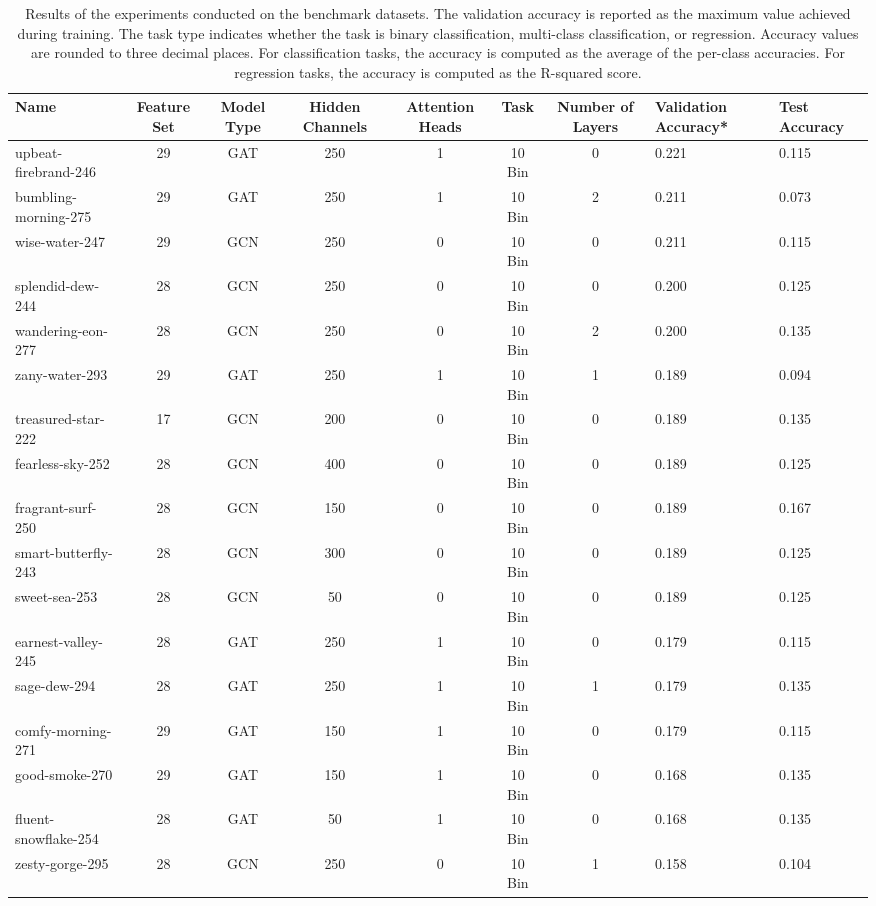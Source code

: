 \begin{table}
\caption{Results of the experiments conducted on the benchmark datasets. The validation accuracy is reported as the maximum value achieved during training. The task type indicates whether the task is binary classification, multi-class classification, or regression. Accuracy values are rounded to three decimal places. For classification tasks, the accuracy is computed as the average of the per-class accuracies. For regression tasks, the accuracy is computed as the R-squared score.}
\label{tab:wandb_export}
\begin{tabular}{lcccccc}
\toprule
Name & Feature Set & Model Type & Hidden Channels & Attention Heads & Task & Number of Layers & Validation Accuracy* & Test Accuracy \\
\midrule
upbeat-firebrand-246 & 29 & GAT & 250 & 1 & 10 Bin & 0 & 0.221 & 0.115 \\
bumbling-morning-275 & 29 & GAT & 250 & 1 & 10 Bin & 2 & 0.211 & 0.073 \\
wise-water-247 & 29 & GCN & 250 & 0 & 10 Bin & 0 & 0.211 & 0.115 \\
splendid-dew-244 & 28 & GCN & 250 & 0 & 10 Bin & 0 & 0.200 & 0.125 \\
wandering-eon-277 & 28 & GCN & 250 & 0 & 10 Bin & 2 & 0.200 & 0.135 \\
zany-water-293 & 29 & GAT & 250 & 1 & 10 Bin & 1 & 0.189 & 0.094 \\
treasured-star-222 & 17 & GCN & 200 & 0 & 10 Bin & 0 & 0.189 & 0.135 \\
fearless-sky-252 & 28 & GCN & 400 & 0 & 10 Bin & 0 & 0.189 & 0.125 \\
fragrant-surf-250 & 28 & GCN & 150 & 0 & 10 Bin & 0 & 0.189 & 0.167 \\
smart-butterfly-243 & 28 & GCN & 300 & 0 & 10 Bin & 0 & 0.189 & 0.125 \\
sweet-sea-253 & 28 & GCN & 50 & 0 & 10 Bin & 0 & 0.189 & 0.125 \\
earnest-valley-245 & 28 & GAT & 250 & 1 & 10 Bin & 0 & 0.179 & 0.115 \\
sage-dew-294 & 28 & GAT & 250 & 1 & 10 Bin & 1 & 0.179 & 0.135 \\
comfy-morning-271 & 29 & GAT & 150 & 1 & 10 Bin & 0 & 0.179 & 0.115 \\
good-smoke-270 & 29 & GAT & 150 & 1 & 10 Bin & 0 & 0.168 & 0.135 \\
fluent-snowflake-254 & 28 & GAT & 50 & 1 & 10 Bin & 0 & 0.168 & 0.135 \\
zesty-gorge-295 & 28 & GCN & 250 & 0 & 10 Bin & 1 & 0.158 & 0.104 \\

\end{tabular}
\end{table}
